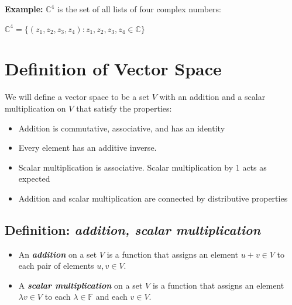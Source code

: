\documentclass{report}
\begin{document}
\textbf{Example:} $\mathbb{C}^4$ is the set of all lists of four complex numbers:\newline
	\centerline{$\mathbb{C}^4=\{(z_1,z_2,z_3,z_4):z_1,z_2,z_3,z_4 \in \mathbb{C}\}$}\newline







\section{Definition of Vector Space}
We will define a vector space to be a set $V$ with an addition and a scalar multiplication on $V$ that satisfy the properties: 
\begin{itemize}
	\item Addition is commutative, associative, and has an identity
    \item Every element has an additive inverse.
    \item Scalar multiplication is associative. Scalar multiplication by 1 acts as expected
    \item Addition and scalar multiplication are connected by distributive properties
\end{itemize}

\subsection{Definition: \textbf{\textit{addition, scalar multiplication}}}
\begin{itemize}
	\item An \textbf{\textit{addition}} on a set $V$ is a function that assigns an element $u+v \in V$ to each pair of elements $u,v \in V$.
    \item A \textbf{\textit{scalar multiplication}} on a set $V$ is a function that assigns an element $\lambda v \in V$ to each $\lambda \in \mathbb{F}$ and each $v \in V$.
\end{itemize}
\end{document}
